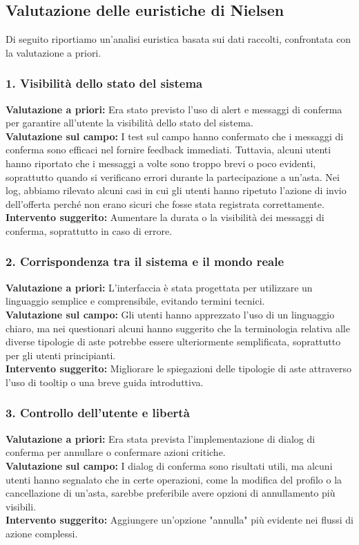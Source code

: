 \subsection{Valutazione delle euristiche di Nielsen}

Di seguito riportiamo un'analisi euristica basata sui dati raccolti, confrontata con la valutazione a priori.

\subsubsection{1. Visibilità dello stato del sistema}
\textbf{Valutazione a priori:} Era stato previsto l’uso di alert e messaggi di conferma per garantire all'utente la visibilità dello stato del sistema.\\
\textbf{Valutazione sul campo:} I test sul campo hanno confermato che i messaggi di conferma sono efficaci nel fornire feedback immediati. Tuttavia, alcuni utenti hanno riportato che i messaggi a volte sono troppo brevi o poco evidenti, soprattutto quando si verificano errori durante la partecipazione a un'asta. Nei log, abbiamo rilevato alcuni casi in cui gli utenti hanno ripetuto l'azione di invio dell'offerta perché non erano sicuri che fosse stata registrata correttamente.\\
\textbf{Intervento suggerito:} Aumentare la durata o la visibilità dei messaggi di conferma, soprattutto in caso di errore.

\subsubsection{2. Corrispondenza tra il sistema e il mondo reale}
\textbf{Valutazione a priori:} L'interfaccia è stata progettata per utilizzare un linguaggio semplice e comprensibile, evitando termini tecnici.\\
\textbf{Valutazione sul campo:} Gli utenti hanno apprezzato l'uso di un linguaggio chiaro, ma nei questionari alcuni hanno suggerito che la terminologia relativa alle diverse tipologie di aste potrebbe essere ulteriormente semplificata, soprattutto per gli utenti principianti.\\
\textbf{Intervento suggerito:} Migliorare le spiegazioni delle tipologie di aste attraverso l'uso di tooltip o una breve guida introduttiva.

\subsubsection{3. Controllo dell'utente e libertà}
\textbf{Valutazione a priori:} Era stata prevista l'implementazione di dialog di conferma per annullare o confermare azioni critiche.\\
\textbf{Valutazione sul campo:} I dialog di conferma sono risultati utili, ma alcuni utenti hanno segnalato che in certe operazioni, come la modifica del profilo o la cancellazione di un'asta, sarebbe preferibile avere opzioni di annullamento più visibili.\\
\textbf{Intervento suggerito:} Aggiungere un'opzione "annulla" più evidente nei flussi di azione complessi.

